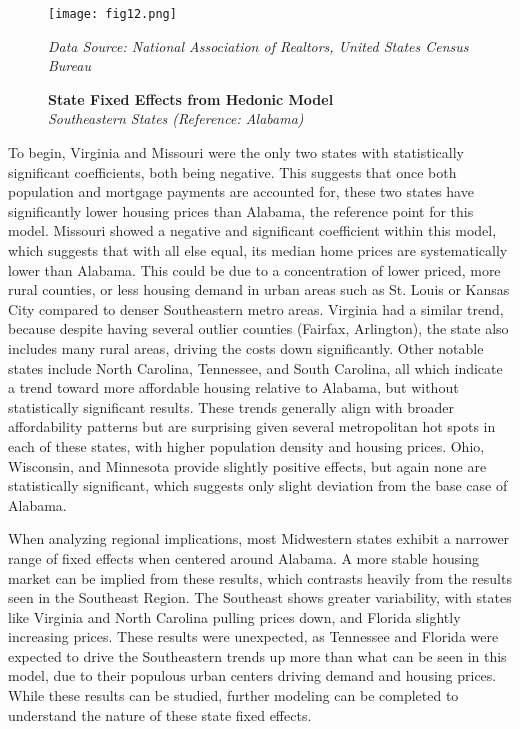 \documentclass[journal,article,submit,pdftex,moreauthors]{Definitions/mdpi}
\begin{document}
\begin{figure}[H]
  \centering
  \texttt{[image: fig12.png]}
  \caption{\textbf{State Fixed Effects from Hedonic Model}\\\textit{Southeastern States (Reference: Alabama)}}
  \label{fig:figure12}
  \vspace{1ex}
  {\footnotesize\textit{Data Source: National Association of Realtors, United States Census Bureau}}
\end{figure}

To begin, Virginia and Missouri were the only two states with statistically significant coefficients, both being negative. This suggests that once both population and mortgage payments are accounted for, these two states have significantly lower housing prices than Alabama, the reference point for this model. Missouri showed a negative and significant coefficient within this model, which suggests that with all else equal, its median home prices are systematically lower than Alabama. This could be due to a concentration of lower priced, more rural counties, or less housing demand in urban areas such as St. Louis or Kansas City compared to denser Southeastern metro areas. Virginia had a similar trend, because despite having several outlier counties (Fairfax, Arlington), the state also includes many rural areas, driving the costs down significantly.
Other notable states include North Carolina, Tennessee, and South Carolina, all which indicate a trend toward more affordable housing relative to Alabama, but without statistically significant results. These trends generally align with broader affordability patterns but are surprising given several metropolitan hot spots in each of these states, with higher population density and housing prices. Ohio, Wisconsin, and Minnesota provide slightly positive effects, but again none are statistically significant, which suggests only slight deviation from the base case of Alabama.

When analyzing regional implications, most Midwestern states exhibit a narrower range of fixed effects when centered around Alabama. A more stable housing market can be implied from these results, which contrasts heavily from the results seen in the Southeast Region. The Southeast shows greater variability, with states like Virginia and North Carolina pulling prices down, and Florida slightly increasing prices. These results were unexpected, as Tennessee and Florida were expected to drive the Southeastern trends up more than what can be seen in this model, due to their populous urban centers driving demand and housing prices. While these results can be studied, further modeling can be completed to understand the nature of these state fixed effects.  
 
\end{document}
